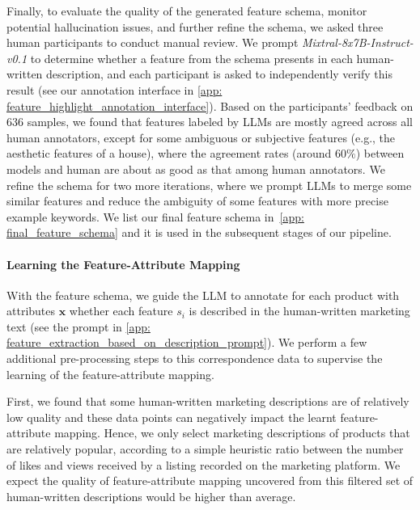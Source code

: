 Finally, to evaluate the quality of the generated feature schema, monitor potential hallucination issues, and further refine the schema, we asked three human participants to conduct manual review.
We prompt 
\textit{Mixtral-8x7B-Instruct-v0.1} 
to determine whether a feature from the schema presents in each human-written description, and each participant is asked to independently verify this result (see our annotation interface in \cref{app: feature_highlight_annotation_interface}). Based on the participants' feedback on 636 samples, we found that features labeled by LLMs are mostly agreed across all human annotators, except for some ambiguous or subjective features (e.g., the aesthetic features of a house), where the agreement rates (around $60\%$) between models and human are about as good as that among human annotators.
We refine the schema for two more iterations, where we prompt LLMs to merge some similar features and reduce the ambiguity of some features with more precise example keywords.  We list our final feature schema in~\cref{app: final_feature_schema} and it is used in the subsequent stages of our pipeline.

\paragraph{Learning the Feature-Attribute Mapping}
With the feature schema, we guide the LLM to annotate for each product with attributes $\mathbf{x}$ whether each feature ${s}_i$ is described in the human-written marketing text (see the prompt in \cref{app: feature_extraction_based_on_description_prompt}).  We perform a few additional pre-processing steps to this correspondence data to supervise the learning of the feature-attribute mapping.

First, we found that some human-written marketing descriptions are of relatively low quality and these data points can negatively impact the learnt feature-attribute mapping. Hence, we only select marketing descriptions of products that are relatively popular, according to a simple heuristic ratio between the number of likes and views received by a listing recorded on the marketing platform. We expect the quality of feature-attribute mapping uncovered from this filtered set of human-written descriptions would be higher than average.

